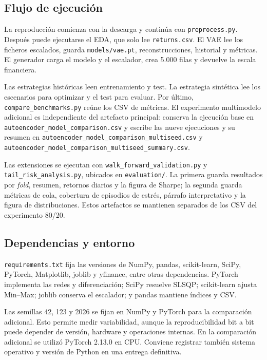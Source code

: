 \subsection{Flujo de ejecución}

La reproducción comienza con la descarga y continúa con \texttt{preprocess.py}. Después puede ejecutarse el EDA, que solo lee \texttt{returns.csv}. El VAE lee los ficheros escalados, guarda \texttt{models/vae.pt}, reconstrucciones, historial y métricas. El generador carga el modelo y el escalador, crea 5.000 filas y devuelve la escala financiera.

Las estrategias históricas leen entrenamiento y test. La estrategia sintética lee los escenarios para optimizar y el test para evaluar. Por último, \texttt{compare\_benchmarks.py} reúne los CSV de métricas. El experimento multimodelo adicional es independiente del artefacto principal: conserva la ejecución base en \texttt{autoencoder\_model\_comparison.csv} y escribe las nueve ejecuciones y su resumen en \texttt{autoencoder\_model\_comparison\_multiseed.csv} y \texttt{autoencoder\_model\_comparison\_multiseed\_summary.csv}.

Las extensiones se ejecutan con \texttt{walk\_forward\_validation.py} y \texttt{tail\_risk\_analysis.py}, ubicados en \texttt{evaluation/}. La primera guarda resultados por \textit{fold}, resumen, retornos diarios y la figura de Sharpe; la segunda guarda métricas de cola, cobertura de episodios de estrés, párrafo interpretativo y la figura de distribuciones. Estos artefactos se mantienen separados de los CSV del experimento 80/20.

\subsection{Dependencias y entorno}

\texttt{requirements.txt} fija las versiones de NumPy, pandas, scikit-learn, SciPy, PyTorch, Matplotlib, joblib y yfinance, entre otras dependencias. PyTorch implementa las redes y diferenciación; SciPy resuelve SLSQP; scikit-learn ajusta Min--Max; joblib conserva el escalador; y pandas mantiene índices y CSV.

Las semillas 42, 123 y 2026 se fijan en NumPy y PyTorch para la comparación adicional. Esto permite medir variabilidad, aunque la reproducibilidad bit a bit puede depender de versión, hardware y operaciones internas. En la comparación adicional se utilizó PyTorch 2.13.0 en CPU. Conviene registrar también sistema operativo y versión de Python en una entrega definitiva.

